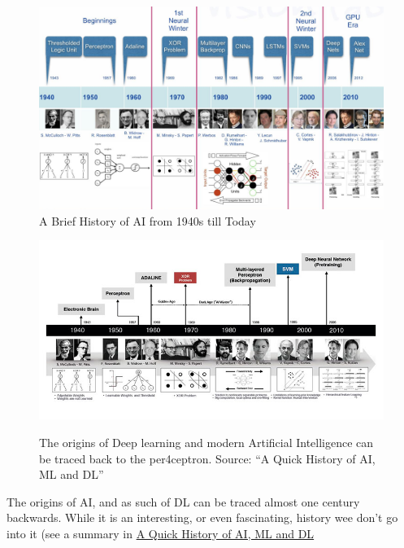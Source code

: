 \documentclass[
  letterpaper,
  DIV=11,
  numbers=noendperiod,
  oneside]{scrartcl}
\begin{document}
\begin{figure}

{\centering \includegraphics{images/AIHistory1.jpg}

}

\caption{A Brief History of AI from 1940s till Today}

\end{figure}

\begin{figure}

{\centering 

\href{https://nerdyelectronics.com/a-quick-history-of-ai-ml-and-dl/}{\includegraphics{images/AIHistory2.jpg}}

}

\caption{The origins of Deep learning and modern Artificial Intelligence
can be traced back to the per4ceptron. Source: ``A Quick History of AI,
ML and DL''}

\end{figure}

The origins of AI, and as such of DL can be traced almost one century
backwards. While it is an interesting, or even fascinating, history wee
don't go into it (see a summary in
\protect\hypertarget{AIHistory}{\href{https://nerdyelectronics.com/a-quick-history-of-ai-ml-and-dl/}{A
Quick History of AI, ML and DL}}
\end{document}
